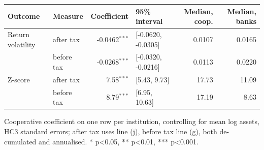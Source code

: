 \footnotesize
\setlength{\tabcolsep}{4pt}
\begin{tabular}{llrlrr}
\toprule
Outcome & Measure & Coefficient & 95\% interval & Median, coop. & Median, banks \\
\midrule
Return volatility & after tax & -0.0462$^{***}$ & [-0.0620, -0.0305] & 0.0107 & 0.0165 \\
 & before tax & -0.0268$^{***}$ & [-0.0320, -0.0216] & 0.0113 & 0.0220 \\
\midrule
Z-score & after tax & 7.58$^{***}$ & [5.43, 9.73] & 17.73 & 11.09 \\
 & before tax & 8.79$^{***}$ & [6.95, 10.63] & 17.19 & 8.63 \\
\bottomrule
\end{tabular}
\begin{tablenotes}[flushleft]\footnotesize
\item Cooperative coefficient on one row per institution, controlling for mean log assets, HC3 standard errors; after tax uses line (j), before tax line (g), both de-cumulated and annualised. * p<0.05, ** p<0.01, *** p<0.001.
\end{tablenotes}
